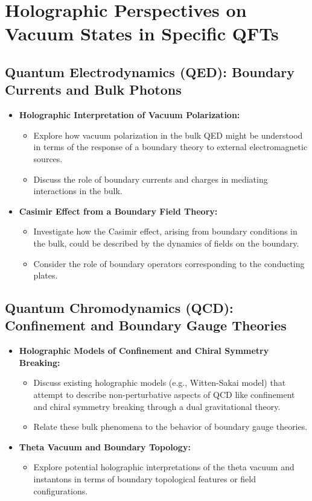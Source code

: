 \documentclass{amsart}
\begin{document}
\section{Holographic Perspectives on Vacuum States in Specific QFTs}

\subsection{Quantum Electrodynamics (QED): Boundary Currents and Bulk Photons}
\begin{itemize}
    \item \textbf{Holographic Interpretation of Vacuum Polarization:}
        \begin{itemize}
            \item Explore how vacuum polarization in the bulk QED might be understood in terms of the response of a boundary theory to external electromagnetic sources.
            \item Discuss the role of boundary currents and charges in mediating interactions in the bulk.
        \end{itemize}
    \item \textbf{Casimir Effect from a Boundary Field Theory:}
        \begin{itemize}
            \item Investigate how the Casimir effect, arising from boundary conditions in the bulk, could be described by the dynamics of fields on the boundary.
            \item Consider the role of boundary operators corresponding to the conducting plates.
        \end{itemize}
\end{itemize}

\subsection{Quantum Chromodynamics (QCD): Confinement and Boundary Gauge Theories}
\begin{itemize}
    \item \textbf{Holographic Models of Confinement and Chiral Symmetry Breaking:}
        \begin{itemize}
            \item Discuss existing holographic models (e.g., Witten-Sakai model) that attempt to describe non-perturbative aspects of QCD like confinement and chiral symmetry breaking through a dual gravitational theory.
            \item Relate these bulk phenomena to the behavior of boundary gauge theories.
        \end{itemize}
    \item \textbf{Theta Vacuum and Boundary Topology:}
        \begin{itemize}
            \item Explore potential holographic interpretations of the theta vacuum and instantons in terms of boundary topological features or field configurations.
        \end{itemize}
\end{itemize}
\end{document}
